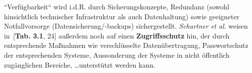 \noindent
``Verfügbarkeit`` wird i.d.R. durch Sicherungskonzepte, Redundanz (sowohl hinsichtlich technischer Infrastruktur als auch Datenhaltung) sowie geeigneter Notfallvorsorge (Datensicherung/-backups) sichergestellt.
\textit{Schartner et al.} weisen in~\cite{HKRS+14}[\textbf{Tab. 3.1}, 24] außerdem noch auf einen \textbf{Zugriffsschutz} hin, der durch entsprechende Maßnahmen wie verschlüsselte Datenübertragung, Passwortschutz der entsprechenden Systeme, Aussonderung der Systeme in nicht öffentlich zugänglichen Bereiche, \ldots unterstützt werden kann.


